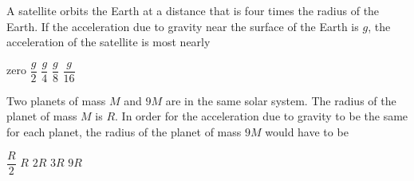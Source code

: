 \documentclass{../../oss-classkick-exam}
\begin{document}
\begin{questions}
\begin{multicols*}{2}
    \question A satellite orbits the Earth at a distance that is four times the
    radius of the Earth. If the acceleration due to gravity near the surface of
    the Earth is $g$, the acceleration of the satellite is most nearly
    \begin{choices}
      \choice zero
      \choice $\dfrac g2$
      \choice $\dfrac g4$
      \choice $\dfrac g8$
      \choice $\dfrac g{16}$
    \end{choices}
  
%  
    
    \question Two planets of mass $M$ and $9M$ are in the same solar system. The
    radius of the planet of mass $M$ is $R$. In order for the acceleration due
    to gravity to be the same for each planet, the radius of the planet of mass
    $9M$ would have to be
    \begin{choices}
      \choice $\dfrac R2$
      \choice $R$
      \choice $2R$
      \choice $3R$
      \choice $9R$
    \end{choices}
    

\end{multicols*}
\end{questions}
\end{document}
